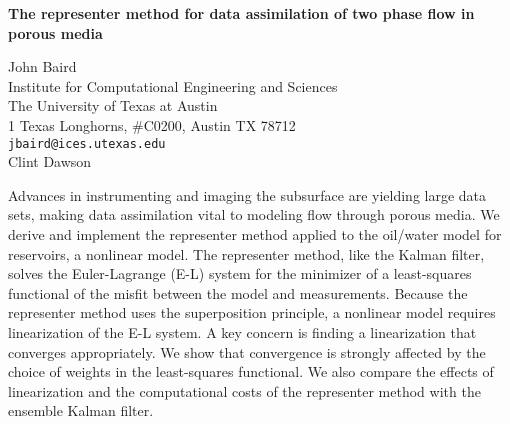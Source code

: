 \documentclass{report}
\begin{document}

\begin{center}
{\large
{\bf The representer method for data assimilation
of two phase flow in porous media}}

	John Baird \\
	Institute for Computational Engineering and Sciences \\
	The University of Texas at Austin \\
	1 Texas Longhorns, \#C0200, \quad  Austin TX 78712 \\
	{\tt jbaird@ices.utexas.edu} \\
	Clint Dawson
\end{center}
Advances in instrumenting and imaging the subsurface are
yielding large data sets, making data assimilation vital to
modeling flow through porous media. We derive and implement
the representer method applied to the oil/water model for
reservoirs, a nonlinear model. The representer method, like
the Kalman filter, solves the Euler-Lagrange (E-L) system
for the minimizer of a least-squares functional of the
misfit between the model and measurements. Because the
representer method uses the superposition principle, a
nonlinear model requires linearization of the E-L system. A
key concern is finding a linearization that converges
appropriately. We show that convergence is strongly affected
by the choice of weights in the least-squares functional. We
also compare the effects of linearization and the
computational costs of the representer method with the
ensemble Kalman filter.



\end{document}
